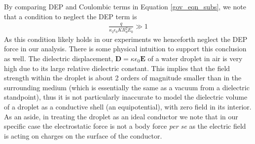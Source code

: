 \documentclass[12pt,a4paper,oneside]{book}
\begin{document}
By comparing DEP and Coulombic terms in Equation \ref{gov_eqn_subs}, we note that a condition to neglect the DEP term is
\begin{eqnarray}
\frac{q}{ \kappa_2 \epsilon_0 K R_d^2 E_0} \gg 1 \nonumber
\end{eqnarray}
As this condition likely holds in our experiments we henceforth neglect the DEP force in our analysis. There is some physical intuition to support this conclusion as well. The dielectric displacement, $\mathbf{D} = \kappa \epsilon_0 \mathbf{E}$ of a water droplet in air is very high due to its large relative dielectric constant. This implies that the field strength within the droplet is about 2 orders of magnitude smaller than in the surrounding medium (which is essentially the same as a vacuum from a dielectric standpoint), thus it is not particularly inaccurate to model the dielectric volume of a droplet as a conductive shell (an equipotential), with zero field in its interior. As an aside, in treating the droplet as an ideal conductor we note that in our specific case the electrostatic force is not a body force \emph{per se} as the electric field is acting on charges on the surface of the conductor.
\end{document}
